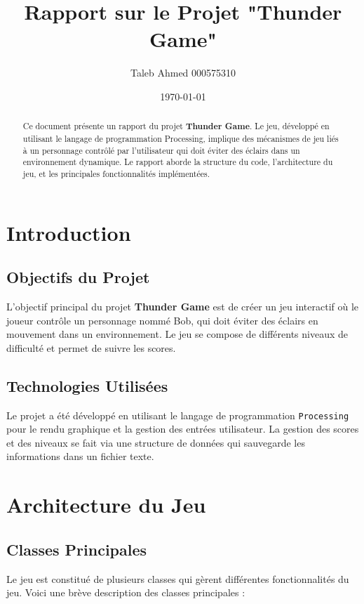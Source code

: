 \documentclass[a4paper,12pt]{article}
\title{Rapport sur le Projet "Thunder Game"}
\author{Taleb Ahmed 000575310}
\date{\today}
\begin{document}
	
	\maketitle
	
	\begin{abstract}
		Ce document présente un rapport du projet \textbf{Thunder Game}. Le jeu, développé en utilisant le langage de programmation Processing, implique des mécanismes de jeu liés à un personnage contrôlé par l'utilisateur qui doit éviter des éclairs dans un environnement dynamique. Le rapport aborde la structure du code, l'architecture du jeu, et les principales fonctionnalités implémentées.
	\end{abstract}
	
	\newpage
	\tableofcontents
	\newpage
	
	\section{Introduction}
	
	\subsection{Objectifs du Projet}
	\noindent L'objectif principal du projet \textbf{Thunder Game} est de créer un jeu interactif où le joueur contrôle un personnage nommé Bob, qui doit éviter des éclairs en mouvement dans un environnement. Le jeu se compose de différents niveaux de difficulté et permet de suivre les scores.
	
	\subsection{Technologies Utilisées}
	\noindent Le projet a été développé en utilisant le langage de programmation \texttt{Processing} pour le rendu graphique et la gestion des entrées utilisateur. La gestion des scores et des niveaux se fait via une structure de données qui sauvegarde les informations dans un fichier texte.
	
	\newpage
	\section{Architecture du Jeu}
	
	\subsection{Classes Principales}
	\noindent Le jeu est constitué de plusieurs classes qui gèrent différentes fonctionnalités du jeu. Voici une brève description des classes principales :
	
\end{document}
